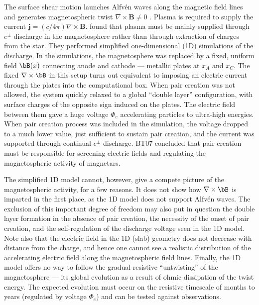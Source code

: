 The surface shear motion launches Alfv\'en waves along the magnetic field lines and
generates magnetospheric twist $\nabla\times \mathbf{B} \neq 0$
\citetext{\citealp{2002ApJ...574..332T}; \citealp{2013ApJ...774...92P},
  hereafter PBH13}.
Plasma is required to supply the current $\mathbf{j} = (c/4\pi)\nabla\times \mathbf{B}$.
\citet[hereafter BT07]{beloborodov_corona_2007}
found that plasma must be mainly supplied through $e^\pm$ discharge in the
magnetosphere rather than through extraction of charges from the star.
They performed simplified one-dimensional (1D) simulations of the discharge.
In the simulations, the magnetosphere was replaced by
a fixed, uniform field $\bB(x)$ connecting anode and cathode ---
metallic plates at $x_A$ and $x_C$. The fixed $\nabla\times\bB$ in this
setup turns out equivalent to imposing an electric current through the plates into
the computational box.
When pair creation was not allowed, the system quickly relaxed to a global
``double layer'' configuration, with surface charges of the opposite sign induced on the plates.
The electric field between them gave a huge voltage $\Phi_e$ accelerating
particles to ultra-high energies. When pair creation process was included in the simulation,
the voltage dropped to a much lower value, just sufficient to sustain pair creation,
and the current was supported through continual $e^\pm$ discharge.
BT07 concluded that pair creation must be responsible for screening
electric fields and regulating the magnetospheric activity of magnetars.

The simplified 1D model cannot, however, give a compete picture of the
magnetospheric activity, for a few reasons. It does not show how
$\nabla\times\bB$ is imparted in the first place, as the 1D model does not
support Alfv\'en waves. The exclusion of this important degree of freedom may
also put in question the double layer formation in the absence of pair creation,
the necessity of the onset of pair creation, and the self-regulation of the
discharge voltage seen in the 1D model. Note also that the electric field in the
1D (slab) geometry does not decrease with distance from the charge, and hence
one cannot see a realistic distribution of the accelerating electric field along
the magnetospheric field lines. Finally, the 1D model offers no way to follow
the gradual resistive ``untwisting'' of the magnetosphere --- its global
evolution as a result of ohmic dissipation of the twist energy. The expected
evolution must occur on the resistive timescale of months to years (regulated by
voltage $\Phi_e$) and can be tested against observations.

